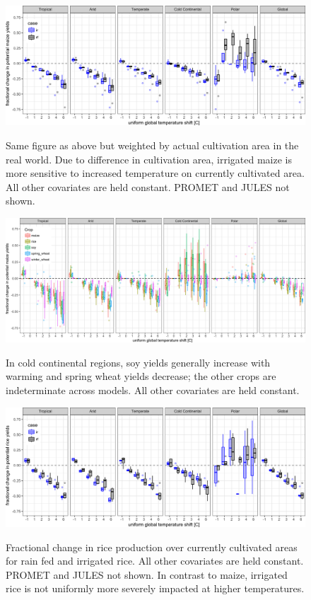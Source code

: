 \documentclass[10pt]{article}
\begin{document}
{\begin{figure}[h!]
\includegraphics[width=\textwidth]{s_maize_sim_CG_area_weight.png}\\
\caption{Same figure as above but weighted by actual cultivation area in the real world. Due to difference in cultivation area, irrigated maize is more sensitive to increased temperature on currently cultivated area. All other covariates are held constant. PROMET and JULES not shown.}
\label{fig:KGirr_currentcult}
\end{figure}

\begin{figure}[h!]
\includegraphics[width=\textwidth]{s_sim_KG_crops_all.png}\\
\caption{In cold continental regions, soy yields generally increase with warming and spring wheat yields decrease; the other crops are indeterminate across models. All other covariates are held constant.}
\label{fig:KGcrops_all}
\end{figure}

\begin{figure}[h!]
\includegraphics[width=\textwidth]{s_rice_sim_CG_area_weight.png}\\
\caption{Fractional change in rice production over currently cultivated areas for rain fed and irrigated rice. All other covariates are held constant. PROMET and JULES not shown. In contrast to maize, irrigated rice is not uniformly more severely impacted at higher temperatures.}
\label{fig:rice_currentcult}
\end{figure}

}
\end{document}
